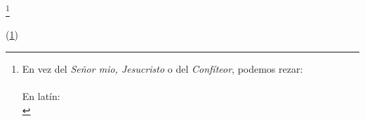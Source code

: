 \documentclass[10pt,twoside]{book}
\begin{document}
\begin{paracol}{2}

      \ensurevspace{20mm}

      \begin{leftcolumn}
            
      \end{leftcolumn}
      \begin{otherlanguage}{latin}
            \begin{rightcolumn}
                      
            \end{rightcolumn}
      \end{otherlanguage}


      \begin{leftcolumn*}
            \footnote{\label{contricion}En vez del \textit{Señor mio, Jesucristo} o del \textit{Confíteor}, podemos rezar:\\ \indent\\ \indent En latín:\\ \indent}
      \end{leftcolumn*}
      \begin{otherlanguage}{latin}
            \begin{rightcolumn}
                (\cref{contricion})
            \end{rightcolumn}
      \end{otherlanguage}

      \begin{leftcolumn*}
            
      \end{leftcolumn*}
      \begin{otherlanguage}{latin}
            \begin{rightcolumn}
                
            \end{rightcolumn}
      \end{otherlanguage}

      \begin{leftcolumn*}
            
      \end{leftcolumn*}
      \begin{otherlanguage}{latin}
            \begin{rightcolumn}
                
            \end{rightcolumn}
      \end{otherlanguage}


\end{paracol}
\end{document}
